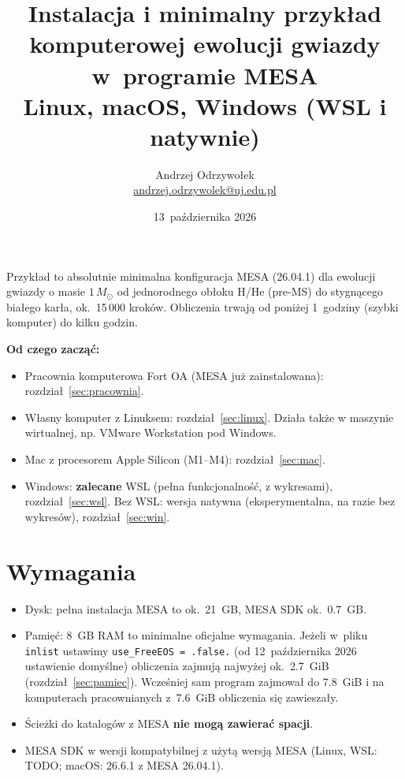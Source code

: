 \documentclass[11pt,a4paper]{article}
\title{Instalacja i minimalny przykład komputerowej ewolucji gwiazdy w~programie MESA\\[0.3em]
  \Large Linux, macOS, Windows (WSL i natywnie)}
\author{Andrzej Odrzywołek\\ \small\href{mailto:andrzej.odrzywolek@uj.edu.pl}{andrzej.odrzywolek@uj.edu.pl}}
\date{13~października 2026}
\begin{document}
\sloppy  %
\maketitle


Przykład to absolutnie minimalna konfiguracja MESA (26.04.1) dla ewolucji gwiazdy o masie
$1\,M_\odot$ od jednorodnego obłoku H/He (pre-MS) do stygnącego białego karła, ok.~15\,000 kroków.
Obliczenia trwają od poniżej 1~godziny (szybki komputer) do kilku godzin.

\textbf{Od czego zacząć:}


\begin{itemize}
  \item Pracownia komputerowa Fort OA (MESA już zainstalowana): rozdział~\ref{sec:pracownia}.
  \item Własny komputer z Linuksem: rozdział~\ref{sec:linux}. Działa także w maszynie wirtualnej, np. VMware Workstation pod Windows. 
  \item Mac z procesorem Apple Silicon (M1--M4): rozdział~\ref{sec:mac}.
  \item Windows: \textbf{zalecane} WSL (pełna funkcjonalność, z wykresami), rozdział~\ref{sec:wsl}.
        Bez WSL: wersja natywna (eksperymentalna, na razie bez wykresów), rozdział~\ref{sec:win}.
\end{itemize}


\tableofcontents

\section{Wymagania}\label{sec:wymagania}

\begin{itemize}
  \item Dysk: pełna instalacja MESA to ok.~21~GB, MESA SDK ok.~0.7~GB.
  \item Pamięć: 8~GB RAM to minimalne oficjalne wymagania. Jeżeli w~pliku \texttt{inlist} ustawimy \verb#use_FreeEOS = .false.# (od 12~października 2026 ustawienie domyślne) obliczenia zajmują najwyżej ok.~2.7~GiB (rozdział~\ref{sec:pamiec}).
  Wcześniej sam program zajmował do 7.8~GiB i na komputerach pracownianych z~7.6~GiB obliczenia się zawieszały.
  \item Ścieżki do katalogów z MESA \textbf{nie mogą zawierać spacji}.
  \item MESA SDK w wersji kompatybilnej z użytą wersją MESA (Linux, WSL: TODO; macOS: 26.6.1 z MESA 26.04.1). 
\end{itemize}
\end{document}
